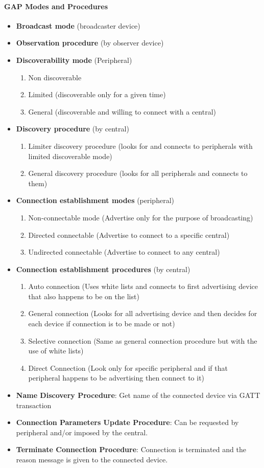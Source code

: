 \paragraph{GAP Modes and Procedures}
\begin{itemize}
	\item \textbf{Broadcast mode} (broadcaster device)
	\item \textbf{Observation procedure} (by observer device)
	\item \textbf{Discoverability mode} (Peripheral)
		\begin{enumerate} 
			\item Non discoverable
			\item Limited (discoverable only for a given time)
			\item General (discoverable and willing to connect with a central)
		\end{enumerate}
	\item \textbf{Discovery procedure} (by central)
		\begin{enumerate}
			\item Limiter discovery procedure (looks for and connects to peripherals with limited discoverable mode)
			\item General discovery procedure (looks for all peripherals and connects to them)
		\end{enumerate}
	\item \textbf{Connection establishment modes} (peripheral)
		\begin{enumerate}
			\item Non-connectable mode (Advertise only for the purpose of broadcasting)
			\item Directed connectable (Advertise to connect to a specific central)
			\item Undirected connectable (Advertise to connect to any central)
		\end{enumerate}
	\item \textbf{Connection establishment procedures} (by central)
		\begin{enumerate}
			\item  Auto connection (Uses white lists and connects to first advertising device that also happens to be on the list)
			\item General connection (Looks for all advertising device and then decides for each device if connection is to be made or not)
			\item Selective connection (Same as general connection procedure but with the use of white lists)
			\item Direct Connection (Look only for specific peripheral and if that peripheral happens to be advertising then connect to it)
		\end{enumerate}
	\item \textbf{Name Discovery Procedure}: Get name of the connected device via GATT transaction
	\item \textbf{Connection Parameters Update Procedure}: Can be requested by peripheral and/or imposed by the central.
	\item \textbf{Terminate Connection Procedure}: Connection is terminated and the reason message is given to the connected device.
\end{itemize}
